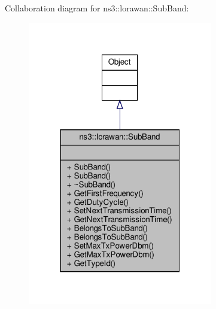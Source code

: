 Collaboration diagram for ns3\+:\+:lorawan\+:\+:Sub\+Band\+:
\nopagebreak
\begin{figure}[H]
\begin{center}
\leavevmode
\includegraphics[width=229pt]{classns3_1_1lorawan_1_1SubBand__coll__graph}
\end{center}
\end{figure}
